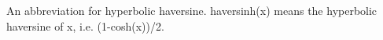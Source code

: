 An abbreviation for hyperbolic haversine. haversinh(x) means the hyperbolic haversine
of x, i.e. (1-cosh(x))/2.